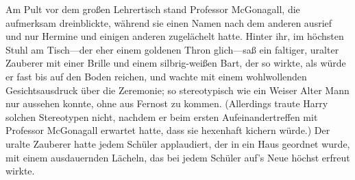 Am Pult vor dem großen Lehrertisch stand Professor McGonagall, die aufmerksam dreinblickte, während sie einen Namen nach dem anderen ausrief und nur Hermine und einigen anderen zugelächelt hatte. Hinter ihr, im höchsten Stuhl am Tisch—der eher einem goldenen Thron glich—saß ein faltiger, uralter Zauberer mit einer Brille und einem silbrig-weißen Bart, der so wirkte, als würde er fast bis auf den Boden reichen, und wachte mit einem wohlwollenden Gesichtsausdruck über die Zeremonie; so stereotypisch wie ein Weiser Alter Mann nur aussehen konnte, ohne aus Fernost zu kommen. (Allerdings traute Harry solchen Stereotypen nicht, nachdem er beim ersten Aufeinandertreffen mit Professor McGonagall erwartet hatte, dass sie hexenhaft kichern würde.) Der uralte Zauberer hatte jedem Schüler applaudiert, der in ein Haus geordnet wurde, mit einem ausdauernden Lächeln, das bei jedem Schüler auf's Neue höchst erfreut wirkte.

